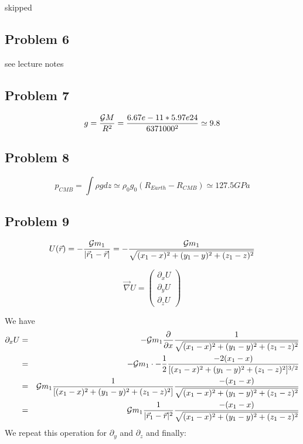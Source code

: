 skipped 

\subsection{Problem 6}

see lecture notes


\subsection{Problem 7}

\[
g = \frac{{\cal G}M}{R^2} = \frac{6.67e-11*5.97e24}{6371000^2} \simeq 9.8
\]

\subsection{Problem 8}

\[
p_{CMB} = \int \rho g dz \simeq \rho_0 g_0 (R_{Earth}-R_{CMB}) \simeq 127.5GPa
\]


\newpage
\subsection{Problem 9}

\[
U(\vec{r}) 
= -\frac{{\cal G} m_1}{|\vec{r}_1 - \vec{r}|} 
= -\frac{{\cal G} m_1}{\sqrt{(x_1-x)^2+(y_1-y)^2+(z_1-z)^2}} 
\]

\[
\vec\nabla U = 
\left(
\begin{array}{c}
\partial_x U \\
\partial_y U \\
\partial_z U 
\end{array}
\right)
\]

We have 
\begin{eqnarray}
\partial_x U 
&=&  -{\cal G} m_1 \frac{\partial }{\partial x} \frac{1}{\sqrt{(x_1-x)^2+(y_1-y)^2+(z_1-z)^2}} \nonumber\\
&=&  -{\cal G} m_1 \cdot -\frac{1}{2}  \frac{-2(x_1-x)}{[(x_1-x)^2+(y_1-y)^2+(z_1-z)^2]^{3/2}} \nonumber\\
&=&  {\cal G} m_1  \frac{1}{[(x_1-x)^2+(y_1-y)^2+(z_1-z)^2]} \frac{-(x_1-x)}{\sqrt{(x_1-x)^2+(y_1-y)^2+(z_1-z)^2}} \nonumber\\
&=&  {\cal G} m_1  \frac{1}{|\vec{r}_1 - \vec{r}|^2} \frac{-(x_1-x)}{\sqrt{(x_1-x)^2+(y_1-y)^2+(z_1-z)^2}} \nonumber
\end{eqnarray}
We repeat this operation for $\partial_y$ and $\partial_z$ and finally:

